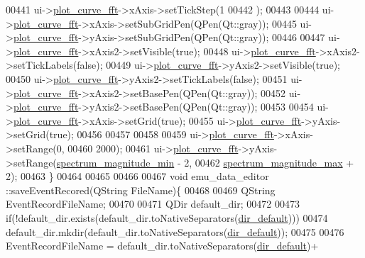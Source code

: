 \begin{DoxyCode}
00441   ui->\hyperlink{a00079_a2bdf46ca3b702151408e6f6bd96b3228}{plot\_curve\_fft}->xAxis->setTickStep(1
00442                                          );
00443 
00444   ui->\hyperlink{a00079_a2bdf46ca3b702151408e6f6bd96b3228}{plot\_curve\_fft}->xAxis->setSubGridPen(QPen(Qt::gray));
00445   ui->\hyperlink{a00079_a2bdf46ca3b702151408e6f6bd96b3228}{plot\_curve\_fft}->yAxis->setSubGridPen(QPen(Qt::gray));
00446 
00447   ui->\hyperlink{a00079_a2bdf46ca3b702151408e6f6bd96b3228}{plot\_curve\_fft}->xAxis2->setVisible(\textcolor{keyword}{true});
00448   ui->\hyperlink{a00079_a2bdf46ca3b702151408e6f6bd96b3228}{plot\_curve\_fft}->xAxis2->setTickLabels(\textcolor{keyword}{false});
00449   ui->\hyperlink{a00079_a2bdf46ca3b702151408e6f6bd96b3228}{plot\_curve\_fft}->yAxis2->setVisible(\textcolor{keyword}{true});
00450   ui->\hyperlink{a00079_a2bdf46ca3b702151408e6f6bd96b3228}{plot\_curve\_fft}->yAxis2->setTickLabels(\textcolor{keyword}{false});
00451   ui->\hyperlink{a00079_a2bdf46ca3b702151408e6f6bd96b3228}{plot\_curve\_fft}->xAxis2->setBasePen(QPen(Qt::gray));
00452   ui->\hyperlink{a00079_a2bdf46ca3b702151408e6f6bd96b3228}{plot\_curve\_fft}->yAxis2->setBasePen(QPen(Qt::gray));
00453 
00454    ui->\hyperlink{a00079_a2bdf46ca3b702151408e6f6bd96b3228}{plot\_curve\_fft}->xAxis->setGrid(\textcolor{keyword}{true});
00455    ui->\hyperlink{a00079_a2bdf46ca3b702151408e6f6bd96b3228}{plot\_curve\_fft}->yAxis->setGrid(\textcolor{keyword}{true});
00456 
00457 
00458 
00459   ui->\hyperlink{a00079_a2bdf46ca3b702151408e6f6bd96b3228}{plot\_curve\_fft}->xAxis->setRange(0,
00460                                        2000);
00461   ui->\hyperlink{a00079_a2bdf46ca3b702151408e6f6bd96b3228}{plot\_curve\_fft}->yAxis->setRange(\hyperlink{a00008_afb692cc49c350d4bf120ca1e3dd61e93}{spectrum\_magnitude\_min} - 2,
00462                                       \hyperlink{a00008_ae0119c7dd2179cdcb3ea37adbefdc289}{spectrum\_magnitude\_max} + 2);
00463 \}
00464 
00465 
00466 
00467 \textcolor{keywordtype}{void} emu\_data\_editor ::saveEventRecored(QString FileName)\{
00468 
00469     QString EventRecordFileName;
00470 
00471             QDir default\_dir;
00472 
00473             \textcolor{keywordflow}{if}(!default\_dir.exists(default\_dir.toNativeSeparators(\hyperlink{a00008_aa55b7d8008e31fcc971692b493e7cf34}{dir\_default})))
00474                 default\_dir.mkdir(default\_dir.toNativeSeparators(\hyperlink{a00008_aa55b7d8008e31fcc971692b493e7cf34}{dir\_default}));
00475 
00476             EventRecordFileName = default\_dir.toNativeSeparators(\hyperlink{a00008_aa55b7d8008e31fcc971692b493e7cf34}{dir\_default})+ 

\end{DoxyCode}
